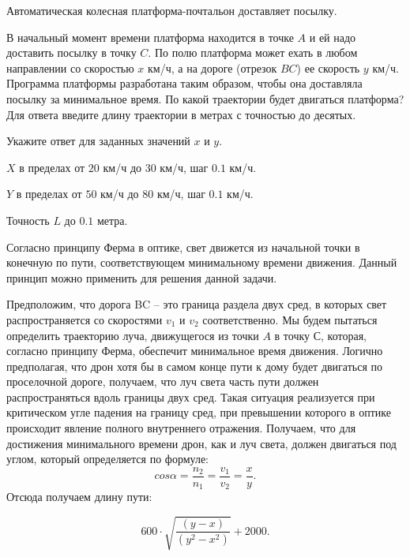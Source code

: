 
Автоматическая колесная платформа-почтальон доставляет посылку. 


В начальный момент времени платформа находится в точке $A$ и ей надо доставить посылку в точку $C$. 
По полю платформа может ехать в любом направлении со скоростью $x$  км/ч, а на дороге (отрезок $BC$) ее скорость $y$ км/ч. 
Программа платформы разработана таким образом, чтобы она доставляла посылку за минимальное время. По
какой траектории будет двигаться платформа? Для ответа введите длину траектории
в метрах с точностью до десятых.


Укажите ответ для заданных значений $x$ и $y$.

\paramSection
$X$ в пределах от $20$ км/ч до $30$ км/ч, шаг $0.1$ км/ч.

$Y$ в пределах от $50$ км/ч до $80$ км/ч, шаг $0.1$ км/ч. 

Точность $L$ до $0.1$ метра.


\solutionSection

Согласно принципу Ферма в оптике, свет движется из начальной точки в конечную по пути, соответствующем минимальному времени движения. 
Данный принцип можно применить для решения данной задачи. 


Предположим, что дорога BC – это граница раздела двух сред, в 
которых свет распространяется со скоростями $v_1$ и $v_2$ соответственно. Мы будем пытаться определить траекторию луча, 
движущегося из точки $A$ в точку $С$, которая, согласно принципу Ферма, обеспечит минимальное время движения. Логично предполагая, 
что дрон хотя бы в самом конце пути к дому будет двигаться по проселочной дороге, получаем, что луч света часть пути должен 
распространяться вдоль границы двух сред. Такая ситуация реализуется при критическом угле падения на границу сред, 
при превышении которого в оптике происходит явление полного внутреннего отражения. Получаем, что для 
достижения минимального времени дрон, как и луч света, должен двигаться под углом, который определяется по формуле: 
$$cos \alpha =\frac{n_2}{n_1} = \frac{v_1}{v_2} = \frac{x}{y}.$$
Отсюда получаем длину пути:

$$600 \cdot \sqrt{ \frac{(y - x)}{(y^2 - x^2)} } +2000.$$

